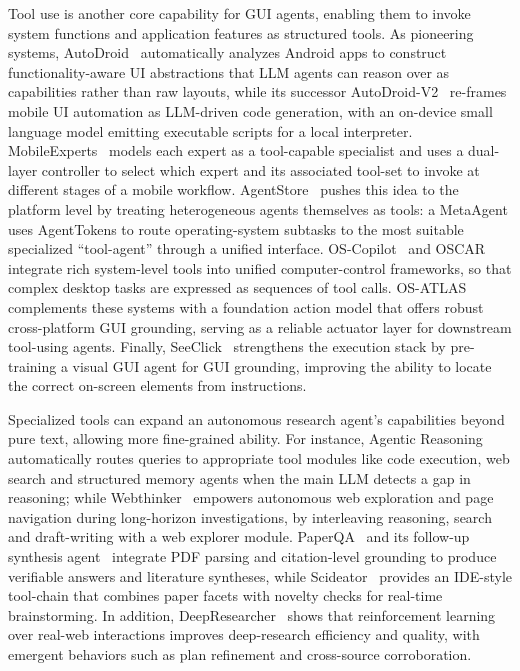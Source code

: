 Tool use is another core capability for GUI agents, enabling them to invoke system functions and application features as structured tools. As pioneering systems, AutoDroid~\cite{wen2024autodroid} automatically analyzes Android apps to construct functionality-aware UI abstractions that LLM agents can reason over as capabilities rather than raw layouts, while its successor AutoDroid-V2~\cite{wen2025autodroid} re-frames mobile UI automation as LLM-driven code generation, with an on-device small language model emitting executable scripts for a local interpreter. MobileExperts~\cite{zhang2024mobileexperts} models each expert as a tool-capable specialist and uses a dual-layer controller to select which expert and its associated tool-set to invoke at different stages of a mobile workflow. AgentStore~\cite{jia2025agentstore} pushes this idea to the platform level by treating heterogeneous agents themselves as tools: a MetaAgent uses AgentTokens to route operating-system subtasks to the most suitable specialized “tool-agent” through a unified interface. OS-Copilot~\cite{wu2024copilot} and OSCAR~\cite{wang2024oscar} integrate rich system-level tools into unified computer-control frameworks, so that complex desktop tasks are expressed as sequences of tool calls. OS-ATLAS~\cite{wu2024atlas} complements these systems with a foundation action model that offers robust cross-platform GUI grounding, serving as a reliable actuator layer for downstream tool-using agents. Finally, SeeClick~\cite{cheng2024seeclick} strengthens the execution stack by pre-training a visual GUI agent for GUI grounding, improving the ability to locate the correct on-screen elements from instructions.


Specialized tools can expand an autonomous research agent’s capabilities beyond pure text, allowing more fine-grained ability. For instance, Agentic Reasoning~\cite{wu2025agentic} automatically routes queries to appropriate tool modules like code execution, web search and structured memory agents when the main LLM detects a gap in reasoning; while Webthinker~\cite{li2025webthinkerempoweringlargereasoning} empowers autonomous web exploration and page navigation during long-horizon investigations, by interleaving reasoning, search and draft-writing with a web explorer module. PaperQA~\cite{lála2023paperqaretrievalaugmentedgenerativeagent} and its follow-up synthesis agent~\cite{skarlinski2024languageagentsachievesuperhuman} integrate PDF parsing and citation-level grounding to produce verifiable answers and literature syntheses, while Scideator~\cite{radensky2025scideatorhumanllmscientificidea} provides an IDE-style tool-chain that combines paper facets with novelty checks for real-time brainstorming. In addition, DeepResearcher~\cite{zheng2025deepresearcher} shows that reinforcement learning over real-web interactions improves deep-research efficiency and quality, with emergent behaviors such as plan refinement and cross-source corroboration. 


